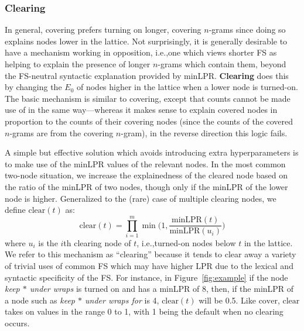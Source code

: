 \documentclass[11pt,letterpaper]{article}
\makeatletter
\def \ie {i.e.,\@ }
\newcommand{\gap}{$*$\xspace}
\newcommand{\ex}[1]{\textit{#1}\xspace}
\newcommand{\termdef}[1]{\textbf{#1}\xspace}
\newcommand{\minLPR}{\ensuremath{\text{minLPR}}}
\newcommand{\cover}{\ensuremath{\text{cover}}\xspace}
\newcommand{\clear}{\ensuremath{\text{clear}}\xspace}
\newcommand{\figref}[2][]{Figure#1~\ref{#2}\xspace}
\makeatother
\begin{document}
\subsubsection{Clearing}

In general, covering prefers turning on longer, covering $n$-grams since doing so explains nodes lower in the lattice. Not surprisingly, it is generally desirable to have a mechanism working in opposition, \ie one which views shorter FS as helping to explain the presence of longer $n$-grams which contain them, beyond the FS-neutral syntactic explanation provided by minLPR. \termdef{Clearing} does this by changing the $E_0$ of nodes higher in the lattice when a lower node is turned-on. The basic mechanism is similar to covering, except that counts cannot be made use of in the same way---whereas it makes sense to explain covered nodes in proportion to the counts of their covering nodes (since the counts of the covered $n$-grams are from the covering $n$-gram), in the reverse direction this logic fails. 

A simple but effective solution which avoids introducing extra hyperparameters is to make use of the minLPR values of the relevant nodes. In the most common two-node situation, we increase the explainedness of the cleared node based on the ratio of the minLPR of two nodes, though only if the minLPR of the lower node is higher. Generalized to the (rare) case of multiple clearing nodes, we define $\clear(t)$ as:
\begin{displaymath}
\clear(t) = \prod_{i=1}^{m}{\min\Big(1,\frac{\minLPR(t)}{\minLPR(u_i)}\Big)}
\end{displaymath}
where $u_i$ is the $i$th clearing node of $t$, \ie turned-on nodes below $t$ in the lattice. We refer to this mechanism as ``clearing'' because it tends to clear away a variety of trivial uses of common FS which may have higher LPR due to the lexical and syntactic specificity of the FS. For instance, in \figref{fig:example} if the node \ex{keep \gap under wraps}  is turned on and has a minLPR of 8, then, if the minLPR of a node such as \ex{keep \gap under wraps for} is 4, $\clear(t)$ will be 0.5. Like \cover, \clear takes on values in the range 0 to 1, with 1 being the default when no clearing occurs. 

\end{document}
